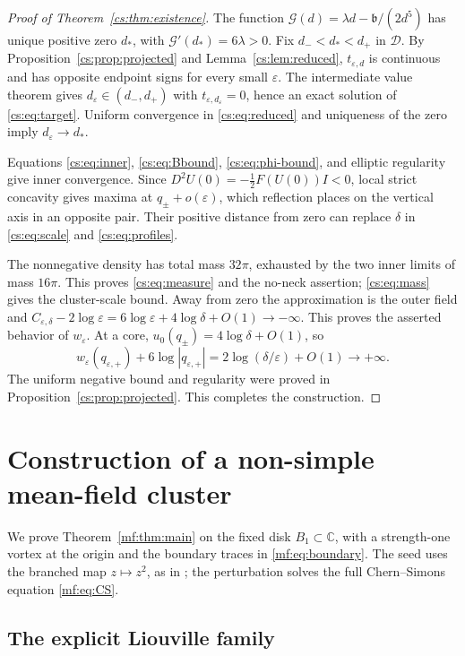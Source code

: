 \documentclass[11pt,reqno]{amsart}
\numberwithin{equation}{section}
\theoremstyle{definition}
\theoremstyle{remark}
\newcommand{\eps}{\varepsilon}
\newcommand{\C}{\mathbb C}
\begin{document}
\begin{proof}[Proof of Theorem~\ref{cs:thm:existence}]
The function $\mathscr G(d)=\lambda d-\mathfrak b/(2d^5)$ has unique
positive zero $d_*$, with $\mathscr G'(d_*)=6\lambda>0$.
Fix $d_-<d_*<d_+$ in $\mathcal D$. By
Proposition~\ref{cs:prop:projected} and Lemma~\ref{cs:lem:reduced},
$t_{\eps,d}$ is continuous and has opposite endpoint signs for every
small $\eps$. The intermediate value theorem gives
$d_\eps\in(d_-,d_+)$ with $t_{\eps,d_\eps}=0$, hence an exact solution
of \eqref{cs:eq:target}. Uniform convergence in \eqref{cs:eq:reduced}
and uniqueness of the zero imply $d_\eps\to d_*$.

Equations \eqref{cs:eq:inner}, \eqref{cs:eq:Bbound},
\eqref{cs:eq:phi-bound}, and elliptic regularity give inner convergence.
Since $D^2U(0)=-\tfrac12 F(U(0))I<0$, local strict concavity gives
maxima at $q_\pm+o(\eps)$, which reflection places on the vertical axis
in an opposite pair. Their positive distance from zero can replace
$\delta$ in \eqref{cs:eq:scale} and \eqref{cs:eq:profiles}.

The nonnegative density has total mass $32\pi$, exhausted by the
two inner limits of mass $16\pi$. This proves \eqref{cs:eq:measure}
and the no-neck assertion; \eqref{cs:eq:mass} gives the cluster-scale bound.
Away from zero the approximation is the outer field and
$C_{\eps,\delta}-2\log\eps
=6\log\eps+4\log\delta+O(1)\to-\infty$.
This proves the asserted behavior of $w_\eps$.
At a core, $u_0(q_\pm)=4\log\delta+O(1)$, so
\[
 w_\eps(q_{\eps,+})+6\log|q_{\eps,+}|
       =2\log(\delta/\eps)+O(1)\longrightarrow+\infty .
\]
The uniform negative bound and regularity were proved in
Proposition~\ref{cs:prop:projected}. This completes the construction.
\end{proof}

\section{Construction of a non-simple mean-field cluster}\label{sec:mf-construction}

We prove Theorem~\ref{mf:thm:main} on the fixed disk $B_1\subset\C$,
with a strength-one vortex at the origin and the boundary traces
in \eqref{mf:eq:boundary}. The seed uses the branched map $z\mapsto z^2$,
as in \cite[Section~2]{DAprileWeiZhangCVPDE}; the perturbation solves
the full Chern--Simons equation \eqref{mf:eq:CS}.

\subsection{The explicit Liouville family}
\end{document}
